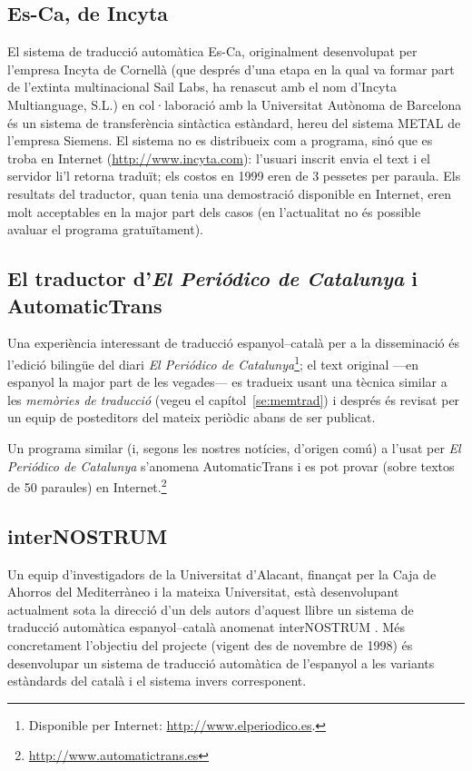 \subsection{Es-Ca, de Incyta}

El sistema de traducció automàtica Es-Ca, originalment desenvolupat
per l'empresa Incyta de Cornellà (que després d'una etapa en la qual
va formar part de l'extinta multinacional Sail Labs, ha renascut amb
el nom d'Incyta Multianguage, S.L.) en col·laboració amb la
Universitat Autònoma de Barcelona és un sistema de transferència
sintàctica estàndard, hereu del sistema METAL de l'empresa Siemens. El
sistema no es distribueix com a programa, sinó que es troba en
Internet (\url{http://www.incyta.com}): l'usuari inscrit envia el
text i el servidor li'l retorna traduït; els costos en 1999 eren de 3
pessetes per paraula.  Els resultats del traductor, quan tenia una
demostració disponible en Internet, eren molt acceptables en la major
part dels casos (en l'actualitat no és possible avaluar el programa
gratuïtament).

\subsection{El traductor d'\emph{El Periódico de Catalunya} i AutomaticTrans}
\label{ss:ePdC}

Una experiència interessant de traducció espanyol--català per a la
disseminació és l'edició bilingüe del diari \emph{El Periódico de
  Catalunya}\footnote{Disponible per Internet:
  \url{http://www.elperiodico.es}.}; el text original ---en
espanyol la major part de les vegades--- es tradueix usant una tècnica
similar a les \emph{memòries de traducció} (vegeu el
capítol~\ref{se:memtrad}) i després és revisat per un equip de
posteditors del mateix periòdic abans de ser publicat.

Un programa similar (i, segons les nostres notícies, d'origen comú) a
l'usat per \emph{El Periódico de Catalunya} s'anomena AutomaticTrans i
es pot provar (sobre textos de 50 paraules) en
Internet.\footnote{\url{http://www.automatictrans.es}}


\subsection{interNOSTRUM}


Un equip d'investigadors de la Universitat d'Alacant, finançat per la
Caja de Ahorros del Mediterràneo i la mateixa Universitat, està
desenvolupant actualment sota la direcció d'un dels autors d'aquest
llibre un sistema de traducció automàtica espanyol--català anomenat
\textsf{interNOSTRUM} \citep{canals01a,canals01b}. Més concretament
l'objectiu del projecte (vigent des de novembre de 1998) és
desenvolupar un sistema de traducció automàtica de l'espanyol a les
variants estàndards del català i el sistema invers corresponent.

